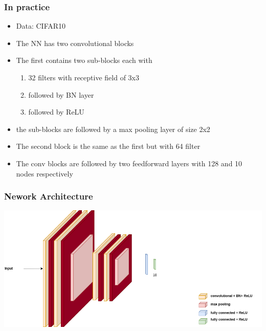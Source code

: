 \documentclass{beamer}
\begin{document}
\begin{frame}
    \frametitle{In practice}
    \begin{itemize}
        \item Data: CIFAR10
        \item The NN has two convolutional blocks 
        \item The first contains two sub-blocks each with 
        \begin{enumerate}
            \item 32 filters with receptive field of 3x3 
            \item followed by BN layer
            \item followed by ReLU
        \end{enumerate}
        \item the sub-blocks are followed by a max pooling layer of size 2x2
       
        \item The second block is the same as the first but with 64 filter 
        \item The conv blocks are followed by two feedforward layers with 128 and 10 nodes respectively
    \end{itemize}
\end{frame}

\begin{frame}
    \frametitle{Nework Architecture}

    \begin{center}
        
        \includegraphics[width=1.1\textwidth]{figs/conv-with-bn.png}
    \end{center}
\end{frame}
\end{document}
